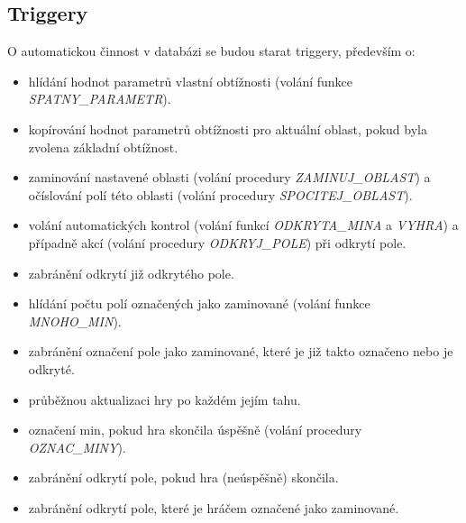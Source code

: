 \documentclass{article}
\begin{document}
\subsection{Triggery}
O automatickou činnost v databázi se budou starat triggery, především o:
\begin{itemize}
    \item hlídání hodnot parametrů vlastní obtížnosti (volání funkce \textit{SPATNY\_PARAMETR}).
    \item kopírování hodnot parametrů obtížnosti pro aktuální oblast, pokud byla zvolena základní obtížnost.
    \item zaminování nastavené oblasti (volání procedury \textit{ZAMINUJ\_OBLAST}) 
        a očíslování polí této oblasti (volání procedury \textit{SPOCITEJ\_OBLAST}).
    \item volání automatických kontrol (volání funkcí \textit{ODKRYTA\_MINA} a \textit{VYHRA}) 
        a případně akcí (volání procedury \textit{ODKRYJ\_POLE}) při odkrytí pole.
    \item zabránění odkrytí již odkrytého pole.
    \item hlídání počtu polí označených jako zaminované (volání funkce \textit{MNOHO\_MIN}).
    \item zabránění označení pole jako zaminované, které je již takto označeno nebo je odkryté.
    \item průběžnou aktualizaci hry po každém jejím tahu.
    \item označení min, pokud hra skončila úspěšně (volání procedury \textit{OZNAC\_MINY}).
    \item zabránění odkrytí pole, pokud hra (neúspěšně) skončila.
    \item zabránění odkrytí pole, které je hráčem označené jako zaminované.
\end{itemize}
\end{document}
